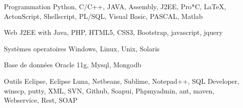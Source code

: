 


\begin{cvskills}


\cvskill
{Programmation} %
{Python, C/C++, JAVA, Assembly, J2EE,  Pro*C,  LaTeX, ActonScript, Shellscript, PL/SQL, Visual Basic,
 PASCAL, Matlab } %


\cvskill
{Web} %
{J2EE with Java, PHP, HTML5, CSS3, Bootstrap, javascript, jquery } %


\cvskill
{Systèmes operatoires} %
{Windows, Linux, Unix, Solaris} %


\cvskill
{Base de données} %
{Oracle 11g, Mysql, Mongodb } %


\cvskill
{Outils} %
{Eclipse, Eclipse Luna, Netbeans, Sublime, Notepad++, SQL Developer,  winscp,  putty, XML, SVN, Github,  Soapui, Phpmyadmin, ant, maven, Webservice, Rest, SOAP } %



\end{cvskills}